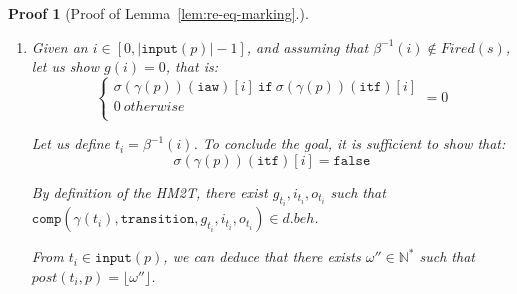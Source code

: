 \documentclass[pdflatex,sn-mathphys]{sn-jnl}%
\theoremstyle{thmstyleone}%
\theoremstyle{thmstyletwo}%
\newtheorem*{pf}{Proof}%
\theoremstyle{thmstylethree}%
\begin{document}
\begin{pf}[Proof of Lemma~\ref{lem:re-eq-marking}.]
\begin{itemize}
\begin{enumerate}
     \noindent{}Thus, the goal can be rewritten as follows:
     \begin{equation*}
       \boxed{       \omega=
         \begin{cases}
           \omega~\mathtt{if}~\sigma(\gamma(t))(\texttt{fired}) \\
           0~otherwise \\
         \end{cases}
       }
     \end{equation*}
   
     Now, to conclude the proof, let us assume that
     $\sigma(\gamma(t))(\texttt{fired})=\mathtt{true}$ iff
     $t\in{}Fired(s)$. This assumption comes from Lemma ``Falling edge
     equal fired'', which proof is detailed and illustrated in
     \cite[p.220]{Iampietro2021}. This lemma states that, at the end
     of a falling edge step, there is an equivalence between the set
     of fired transitions and the value of the \texttt{fired} output
     port of each corresponding TDI. Then, knowing that
     $t\in{}Fired(s)$ and that state $s$ results from the execution of
     a previous falling edge step, we can deduce
     $\sigma(\gamma(t))(\texttt{fired})=\mathtt{true}$ and then
     conclude the goal.
     
   \item Given an $i\in[0,\vert\mathtt{input}(p)\vert-1]$, and
     assuming that $\beta^{-1}(i)\notin{}Fired(s)$, let us show
     $g(i)=0$, that is:
     \begin{equation*}
       \boxed{
         \begin{cases}
           \sigma(\gamma(p))(\texttt{iaw})[i]~\mathtt{if}~\sigma(\gamma(p))(\texttt{itf})[i] \\
           0~otherwise \\
         \end{cases}=0
       }
     \end{equation*}

     Let us define $t_i=\beta^{-1}(i)$. To conclude the goal, it is sufficient to show that:
     \begin{equation*}
       \boxed{\sigma(\gamma(p))(\mathtt{itf})[i]=\mathtt{false}}
     \end{equation*}

     By definition of the HM2T, there exist
     $g_{t_i}, i_{t_i}, o_{t_i}$ such that
     $\mathtt{comp}(\gamma(t_i), \mathtt{transition}, g_{t_i},
     i_{t_i}, o_{t_i})\in{}d.beh$.

     From $t_i\in\mathtt{input}(p)$, we can deduce that there exists
     $\omega''\in\mathbb{N}^{*}$ such that
     $post(t_i, p)=\lfloor\omega''\rfloor$.


\end{enumerate}
\end{itemize}
\end{pf}
\end{document}
